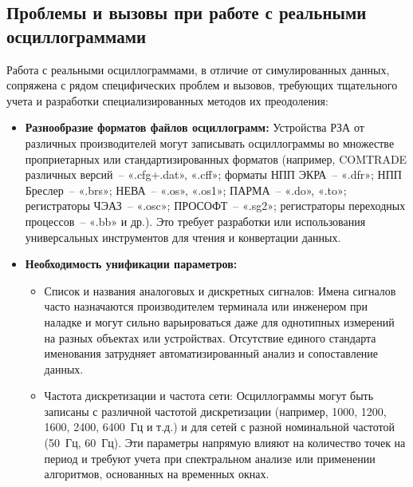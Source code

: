 \subsection{Проблемы и вызовы при работе с реальными осциллограммами}\label{subsec:dataset_challenges}

Работа с реальными осциллограммами, в отличие от симулированных данных, сопряжена с
рядом специфических проблем и вызовов, требующих тщательного учета и разработки
специализированных методов их преодоления:\par\vspace{0.2cm}

\begin{itemize}[itemsep=0pt,topsep=2pt]
  \item \textbf{Разнообразие форматов файлов осциллограмм:} Устройства РЗА от различных производителей могут записывать осциллограммы во множестве проприетарных или стандартизированных форматов (например, COMTRADE различных версий~-- «.cfg+.dat», «.cff»; форматы НПП ЭКРА~-- «.dfr»; НПП Бреслер~-- «.brs»; НЕВА~-- «.os», «.os1»; ПАРМА~-- «.do», «.to»; регистраторы ЧЭАЗ~-- «.osc»; ПРОСОФТ~-- «.sg2»; регистраторы переходных процессов~-- «.bb» и др.). Это требует разработки или использования универсальных инструментов для чтения и конвертации данных.
  \item \textbf{Необходимость унификации параметров:}
  \begin{itemize}[itemsep=0pt,topsep=2pt]
    \item Список и названия аналоговых и дискретных сигналов: Имена сигналов часто назначаются производителем терминала или инженером при наладке и могут сильно варьироваться даже для однотипных измерений на разных объектах или устройствах. Отсутствие единого стандарта именования затрудняет автоматизированный анализ и сопоставление данных.
    \item Частота дискретизации и частота сети: Осциллограммы могут быть записаны с различной частотой дискретизации (например, 1000, 1200, 1600, 2400, 6400~Гц и т.д.) и для сетей с разной номинальной частотой (50~Гц, 60~Гц). Эти параметры напрямую влияют на количество точек на период и требуют учета при спектральном анализе или применении алгоритмов, основанных на временных окнах.

\end{itemize}
\end{itemize}
